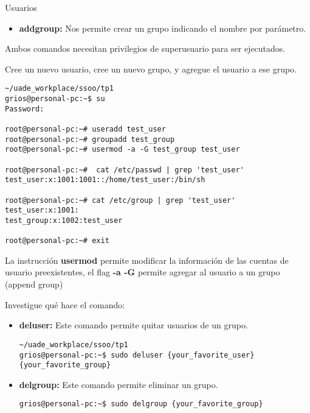 \begin{section}{Usuarios}
\begin{itemize}
\item \textbf{addgroup:}
	Nos permite crear un grupo indicando el nombre por parámetro.
\end{itemize}

Ambos comandos necesitan privilegios de superusuario para ser ejecutados. \\

\begin{quoting}
Cree un nuevo usuario, cree un nuevo grupo, y agregue el usuario a ese grupo.
\end{quoting}


\begin{lstlisting}[style=Ubuntu]
~/uade_workplace/ssoo/tp1
grios@personal-pc:~$ su
Password: 

root@personal-pc:~# useradd test_user
root@personal-pc:~# groupadd test_group
root@personal-pc:~# usermod -a -G test_group test_user

root@personal-pc:~#  cat /etc/passwd | grep 'test_user'
test_user:x:1001:1001::/home/test_user:/bin/sh

root@personal-pc:~# cat /etc/group | grep 'test_user'
test_user:x:1001:
test_group:x:1002:test_user

root@personal-pc:~# exit
\end{lstlisting}

La instrucción \textbf{usermod} permite modificar la información de las cuentas de usuario preexistentes, el flag \textbf{-a -G} permite agregar al usuario a un grupo (append group)\\

\begin{quoting}
Investigue qué hace el comando:
\end{quoting}

\begin{itemize}
\item \textbf{deluser:}
Este comando permite quitar usuarios de un grupo.
\begin{lstlisting}[style=Ubuntu]
~/uade_workplace/ssoo/tp1
grios@personal-pc:~$ sudo deluser {your_favorite_user} {your_favorite_group} 
\end{lstlisting}

\item \textbf{delgroup:}
Este comando permite eliminar un grupo.
\begin{lstlisting}[style=Ubuntu]
grios@personal-pc:~$ sudo delgroup {your_favorite_group} 
\end{lstlisting}
\end{itemize}


\end{section}
